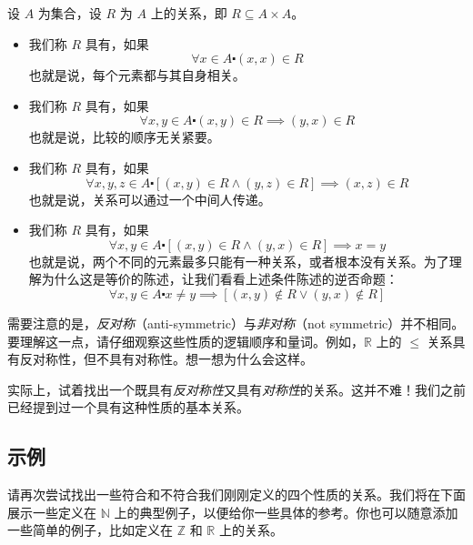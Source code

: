 \begin{definition}
    设 $A$ 为集合，设 $R$ 为 $A$ 上的关系，即 $R \subseteq A \times A$。
    \begin{itemize}
        \item 我们称 $R$ 具有，如果
            \[\forall x \in A \centerdot (x, x) \in R\]
            也就是说，每个元素都与其自身相关。
        \item 我们称 $R$ 具有，如果
            \[\forall x,y \in A \centerdot (x, y) \in R \implies (y,x) \in R\]
            也就是说，比较的顺序无关紧要。
        \item 我们称 $R$ 具有，如果
            \[\forall x, y, z \in A \centerdot [(x, y) \in R \land (y, z) \in R] \implies (x, z) \in R\]
            也就是说，关系可以通过一个中间人传递。
        \item 我们称 $R$ 具有，如果
            \[\forall x, y \in A \centerdot [(x, y) \in R \land (y, x) \in R] \implies x = y\]
            也就是说，两个不同的元素最多只能有一种关系，或者根本没有关系。为了理解为什么这是等价的陈述，让我们看看上述条件陈述的逆否命题：
            \[\forall x, y \in A \centerdot x \ne y \implies [(x, y) \notin R \lor (y, x) \notin R]\]
    \end{itemize}
\end{definition}

需要注意的是，\emph{反对称}（anti-symmetric）与\emph{非对称}（not symmetric）并不相同。要理解这一点，请仔细观察这些性质的逻辑顺序和量词。例如，$\mathbb{R}$ 上的 $\le$ 关系具有反对称性，但不具有对称性。想一想为什么会这样。

实际上，试着找出一个既具有\emph{反对称性}又具有\emph{对称性}的关系。这并不难！我们之前已经提到过一个具有这种性质的基本关系。

\subsection{示例}

请再次尝试找出一些符合和不符合我们刚刚定义的四个性质的关系。我们将在下面展示一些定义在 $\mathbb{N}$ 上的典型例子，以便给你一些具体的参考。你也可以随意添加一些简单的例子，比如定义在 $\mathbb{Z}$ 和 $\mathbb{R}$ 上的关系。\\

